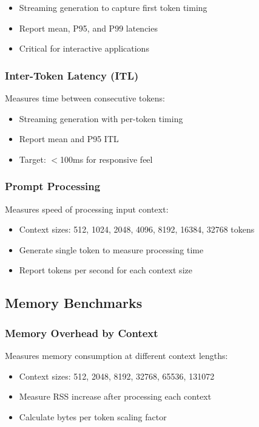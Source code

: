 \begin{itemize}
    \item Streaming generation to capture first token timing
    \item Report mean, P95, and P99 latencies
    \item Critical for interactive applications
\end{itemize}

\subsubsection{Inter-Token Latency (ITL)}

Measures time between consecutive tokens:

\begin{itemize}
    \item Streaming generation with per-token timing
    \item Report mean and P95 ITL
    \item Target: $<$100ms for responsive feel
\end{itemize}

\subsubsection{Prompt Processing}

Measures speed of processing input context:

\begin{itemize}
    \item Context sizes: 512, 1024, 2048, 4096, 8192, 16384, 32768 tokens
    \item Generate single token to measure processing time
    \item Report tokens per second for each context size
\end{itemize}

\subsection{Memory Benchmarks}

\subsubsection{Memory Overhead by Context}

Measures memory consumption at different context lengths:

\begin{itemize}
    \item Context sizes: 512, 2048, 8192, 32768, 65536, 131072
    \item Measure RSS increase after processing each context
    \item Calculate bytes per token scaling factor
\end{itemize}

